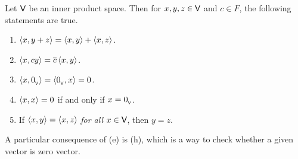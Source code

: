 \begin{theorem} \label{thm 6.1}
Let \(\textsf{V}\) be an inner product space.
Then for \(x, y, z \in \textsf{V}\) and \(c \in F\), the following statements are true.
\begin{enumerate}
\item \(\left< x, y + z \right> = \left< x, y \right> + \left< x, z \right>\).
\item \(\left< x, cy \right> = \overline{c} \left< x, y \right>\).
\item \(\left< x, 0_{_{\textsf{V}}} \right> = \left< 0_{_{\textsf{V}}}, x \right> = 0\).
\item \(\left< x, x \right> = 0\) if and only if \(x = 0_{_{\textsf{V}}}\).
\item If \(\left< x, y \right> = \left< x, z \right>\) \emph{for all} \(x \in \textsf{V}\), then \(y = z\).
\end{enumerate}
\end{theorem}

\begin{note}
A particular consequence of (e) is (h), which is a way to check whether a given vector is zero vector.
\end{note}

